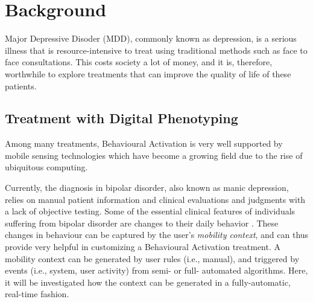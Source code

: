 \section{Background}


Major Depressive Disoder (MDD), commonly known as depression, is a serious illness that is resource-intensive to treat using traditional methods such as face to face consultations. This costs society a lot of money, and it is, therefore, worthwhile to explore treatments that can improve the quality of life of these patients. 

\subsection{Treatment with Digital Phenotyping}
Among many treatments, Behavioural Activation is very well supported by mobile sensing technologies which have become a growing field due to the rise of ubiquitous computing. 

Currently, the diagnosis in bipolar disorder, also known as manic depression, relies on manual patient information and clinical evaluations and judgments with a lack of objective testing. Some of the essential clinical features of individuals suffering from bipolar disorder are changes to their daily behavior \cite{objective_smartphone_data_as_diagnostic_marker}. These changes in behaviour can be captured by the user's \textit{mobility context}, and can thus provide very helpful in customizing a Behavioural Activation treatment. A mobility context can be generated by user rules (i.e., manual), and triggered by events (i.e., system, user activity) from semi- or full- automated algorithms. Here, it will be investigated how the context can be generated in a fully-automatic, real-time fashion.

